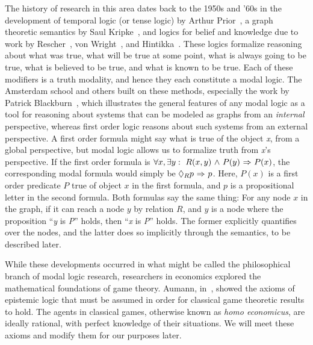 The history of research in this area dates back to the 1950s and '60s in the development of temporal logic (or tense logic) by Arthur Prior~\cite{Prior}, a graph theoretic semantics by Saul Kripke~\cite{Kripke}, and logics for belief and knowledge due to work by Rescher~\cite{rescher}, von Wright~\cite{vonWright}, and Hintikka~\cite{Hintikka}. These logics formalize reasoning about what was true, what will be true at some point, what is always going to be true, what is believed to be true, and what is known to be true. Each of these modifiers is a truth modality, and hence they each constitute a modal logic. The Amsterdam school and others built on these methods, especially the work by Patrick Blackburn~\cite{modal}, which illustrates the general features of any modal logic as a tool for reasoning about systems that can be modeled as graphs from an \emph{internal} perspective, whereas first order logic reasons about such systems from an external perspective. A first order formula might say what is true of the object \emph{x}, from a global perspective, but modal logic allows us to formalize truth from \emph{x}'s perspective. If the first order formula is $\forall x, \exists y:\ R(x,y) {\ \wedge \ } P(y) {\ \Rightarrow \ } P(x)$, the corresponding modal formula would simply be $\Diamond_{R} p {\ \Rightarrow \ } p$. Here, $P(x)$ is a first order predicate $P$ true of object $x$ in the first formula, and $p$ is a propositional letter in the second formula. Both formulas say the same thing: For any node $x$ in the graph, if it can reach a node $y$ by relation $R$, and $y$ is a node where the proposition ``\emph{y} is \emph{P}'' holds, then ``\emph{x} is \emph{P}'' holds. The former explicitly quantifies over the nodes, and the latter does so implicitly through the semantics, to be described later.

While these developments occurred in what might be called the philosophical branch of modal logic research, researchers in economics explored the mathematical foundations of game theory. Aumann, in~\cite{Aumann}, showed the axioms of epistemic logic that must be assumed in order for classical game theoretic results to hold. The agents in classical games, otherwise known as \emph{homo economicus}, are ideally rational, with perfect knowledge of their situations. We will meet these axioms and modify them for our purposes later.

